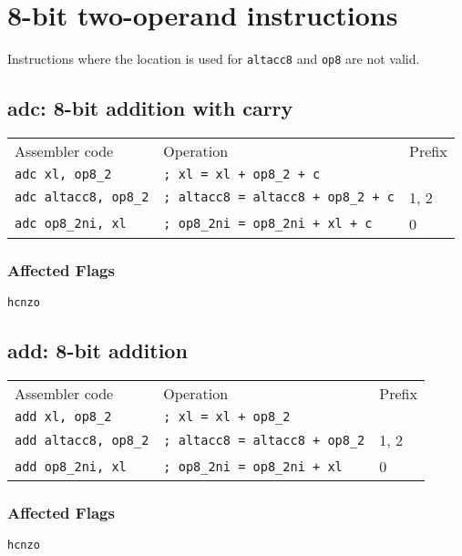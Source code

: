 \documentclass{book}
\begin{document}
\section{8-bit two-operand instructions}

Instructions where the location is used for \texttt{altacc8} and \texttt{op8} are not valid.

\subsection{adc: 8-bit addition with carry}

\begin{tabular}{l l l}
Assembler code            & Operation                                    & Prefix \\
\texttt{adc xl, op8\_2}      & \texttt{; xl = xl + op8\_2 + c}           & \\
\texttt{adc altacc8, op8\_2} & \texttt{; altacc8 = altacc8 + op8\_2 + c} & 1, 2 \\
\texttt{adc op8\_2ni, xl}    & \texttt{; op8\_2ni = op8\_2ni + xl + c}   & 0
\end{tabular}

\subsubsection*{Affected Flags}

\texttt{hcnzo}


\subsection{add: 8-bit addition}

\begin{tabular}{l l l}
Assembler code            & Operation                                & Prefix \\
\texttt{add xl, op8\_2}      & \texttt{; xl = xl + op8\_2}           & \\
\texttt{add altacc8, op8\_2} & \texttt{; altacc8 = altacc8 + op8\_2} & 1, 2 \\
\texttt{add op8\_2ni, xl}      & \texttt{; op8\_2ni = op8\_2ni + xl} & 0
\end{tabular}

\subsubsection*{Affected Flags}

\texttt{hcnzo}
\end{document}
